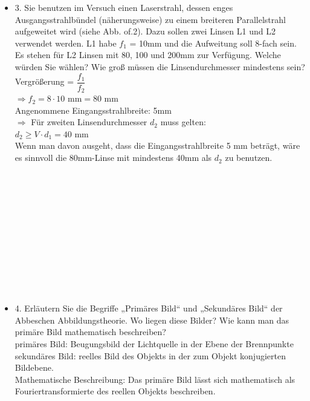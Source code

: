 \begin{itemize}
	\item 3. Sie benutzen im Versuch einen Laserstrahl, dessen enges Ausgangsstrahlbündel (näherungsweise)
	zu einem breiteren Parallelstrahl aufgeweitet wird (siehe Abb. of.2). Dazu sollen zwei
	Linsen L1 und L2 verwendet werden. L1 habe $f_1$ = 10mm und die Aufweitung soll 8-fach sein.
	Es stehen für L2 Linsen mit 80, 100 und 200mm zur Verfügung. Welche würden Sie wählen?
	Wie groß müssen die Linsendurchmesser mindestens sein?\\
	Vergrößerung = $\dfrac{f_1}{f_2}$\\
	$\Rightarrow f_2=8 \cdot 10 \text{ mm}=80 \text{ mm}$\\
	Angenommene Eingangsstrahlbreite: 5mm\\ $\Rightarrow$ Für zweiten Linsendurchmesser $d_2$ muss gelten: \\
	$d_2 \geq V \cdot d_1= 40 \text{ mm}$
\\Wenn man davon ausgeht, dass die Eingangsstrahlbreite 5 mm beträgt, wäre es sinnvoll die 80mm-Linse mit mindestens 40mm als $d_2$ zu benutzen. \\\\\\\\\\\\\\\\\\\\\\\\
	\item 4. Erläutern Sie die Begriffe „Primäres Bild“ und „Sekundäres Bild“ der Abbeschen Abbildungstheorie.
	Wo liegen diese Bilder? Wie kann man das primäre Bild mathematisch beschreiben?\\
	primäres Bild: Beugungsbild der Lichtquelle in der Ebene der Brennpunkte\\
	sekundäres Bild: reelles Bild des Objekts in der zum Objekt konjugierten Bildebene. \\
	Mathematische Beschreibung: 
Das primäre Bild lässt sich mathematisch als Fouriertransformierte des reellen Objekts beschreiben.


\end{itemize}
